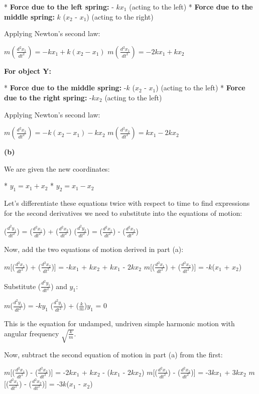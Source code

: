 \documentclass{article}
\begin{document}
* \textbf{Force due to the left spring:}  - $k x_1$ (acting to the left)
* \textbf{Force due to the middle spring:} $k$ ($x_2$ - $x_1$) (acting to the right)

Applying Newton's second law:

  $m (\frac{d^2 x_1}{d t^2}) = -k x_1 + k (x_2 - x_1)$ 
  $m (\frac{d^2 x_1}{d t^2}) = -2k x_1 + k x_2$

\textbf{For object Y:}

* \textbf{Force due to the middle spring:} -$k$ ($x_2$ - $x_1$) (acting to the left)
* \textbf{Force due to the right spring:} -$k x_2$ (acting to the left)

Applying Newton's second law:

  $m (\frac{d^2 x_2}{d t^2}) = -k (x_2 - x_1) - k x_2$
  $m (\frac{d^2 x_2}{d t^2}) = k x_1 - 2k x_2$


\textbf{(b)}

We are given the new coordinates:

* $y_1 = x_1 + x_2$
* $y_2 = x_1 - x_2$

Let's differentiate these equations twice with respect to time to find expressions for the second derivatives we need to substitute into the equations of motion:

($\frac{d^2 y_1}{d t^2}$) = ($\frac{d^2 x_1}{d t^2}$) + ($\frac{d^2 x_2}{d t^2}$)
($\frac{d^2 y_2}{d t^2}$) = ($\frac{d^2 x_1}{d t^2}$) - ($\frac{d^2 x_2}{d t^2}$)

Now, add the two equations of motion derived in part (a):

$m$[($\frac{d^2 x_1}{d t^2}$) + ($\frac{d^2 x_2}{d t^2}$)] = -$k x_1$ + $k x_2$ + $k x_1$ - $2k x_2$
$m$[($\frac{d^2 x_1}{d t^2}$) + ($\frac{d^2 x_2}{d t^2}$)] = -$k$($x_1$ + $x_2$)

Substitute ($\frac{d^2 y_1}{d t^2}$) and $y_1$:

$m$($\frac{d^2 y_1}{d t^2}$) = -$k y_1$
($\frac{d^2 y_1}{d t^2}$) + ($\frac{k}{m}$)$y_1$ = 0

This is the equation for undamped, undriven simple harmonic motion with angular frequency $\sqrt{\frac{k}{m}}$.

Now, subtract the second equation of motion in part (a) from the first:

$m$[($\frac{d^2 x_1}{d t^2}$) - ($\frac{d^2 x_2}{d t^2}$)] = -$2k x_1$ + $k x_2$ - ($k x_1$ - $2k x_2$)
$m$[($\frac{d^2 x_1}{d t^2}$) - ($\frac{d^2 x_2}{d t^2}$)] = -$3k x_1$ + $3k x_2$
$m$[($\frac{d^2 x_1}{d t^2}$) - ($\frac{d^2 x_2}{d t^2}$)] = -$3k$($x_1$ - $x_2$) 
\end{document}
